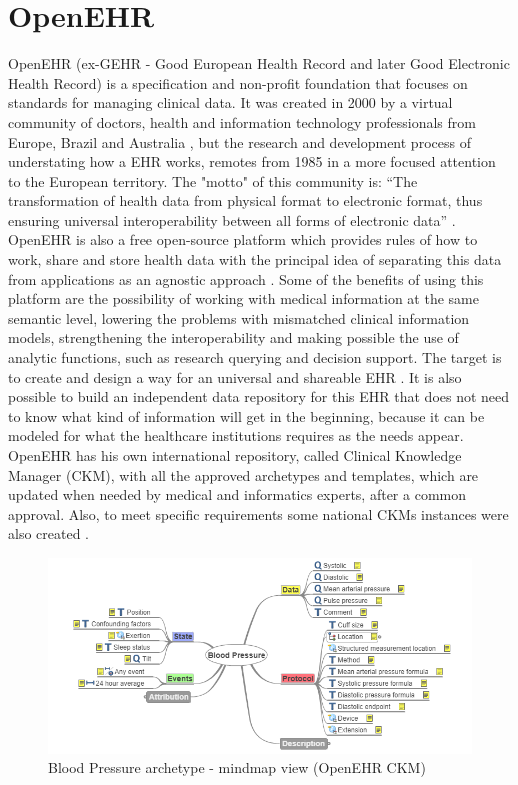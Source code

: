 \documentclass[mim_thesis.tex]{subfiles}
\begin{document}
\section{OpenEHR}
OpenEHR (ex-GEHR - Good European Health Record and later Good Electronic Health Record) is a specification and non-profit foundation that focuses on standards for managing clinical data. It was created in 2000 by a virtual community of doctors, health and information technology professionals from Europe, Brazil and Australia \citep{openEHRhist2002}, but the research and development process of understating how a EHR works, remotes from 1985 in a more focused attention to the European territory. The "motto" of this community is: “The transformation of health data from physical format to electronic format, thus ensuring universal interoperability between all forms of electronic data” \citep{openEHR2018}. OpenEHR is also a free open-source platform which provides rules of how to work, share and store health data with the principal idea of separating this data from applications as an agnostic approach \citep{kalra2005openehr}. Some of the benefits of using this platform are the possibility of working with medical information at the same semantic level, lowering the problems with mismatched clinical information models, strengthening the interoperability and making possible the use of analytic functions, such as research querying and decision support. The target is to create and design a way for an universal and shareable EHR \citep{Madsen2010}.  It is also possible to build an independent data repository for this EHR that does not need to know what kind of information will get in the beginning, because it can be modeled for what the healthcare institutions requires as the needs appear. OpenEHR has his own international repository, called Clinical Knowledge Manager (CKM), with all the approved archetypes and templates, which are updated when needed by medical and informatics experts, after a common approval. Also, to meet specific requirements some national CKMs instances were also created \citep{openEHRCKM}.

\begin{figure}[H]
	\centering
    \includegraphics[width=1\textwidth]{img/bp_openehr.PNG}
	\caption{ Blood Pressure archetype - mindmap view (OpenEHR CKM)}
	\label{fig:bp_openehr}
\end{figure}
\end{document}
